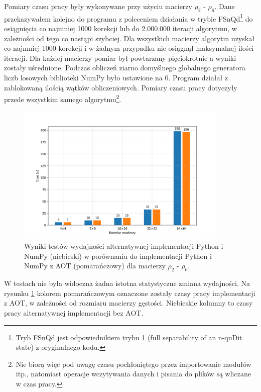 \documentclass[10pt, a4paper]{article}
\begin{document}
\begin{sloppypar}
    Pomiary czasu pracy były wykonywane przy użyciu macierzy $\rho_{2}$ - $\rho_{6}$.
    Dane przekazywałem kolejno do programu z poleceniem działania w trybie FSnQd\footnote{Tryb
    FSnQd jest odpowiednikiem trybu 1 (full separability of an n-quDit state) z oryginalnego
    kodu.} do osiągnięcia co najmniej 1000 korekcji lub do 2.000.000 iteracji algorytmu,
    w zależności od tego co nastąpi szybciej. Dla wszystkich macierzy algorytm uzyskał
    co najmniej 1000 korekcji i w żadnym przypadku nie osiągnął maksymalnej ilości
    iteracji. Dla każdej macierzy pomiar był powtarzany pięciokrotnie a wyniki zostały uśrednione.
    Podczas obliczeń ziarno domyślnego globalnego generatora liczb losowych biblioteki
    NumPy było ustawione na 0. Program działał z zablokowaną ilością wątków
    obliczeniowych. Pomiary czasu pracy dotyczyły przede wszystkim samego algorytmu\footnote{Nie
    biorą więc pod uwagę czasu pochłoniętego przez importowanie modułów itp., natomiast
    operacje wczytywania danych i pisania do plików są wliczane w czas pracy.}.

    \FloatBarrier
    \begin{figure}[ht]
      \centering
      \includegraphics[width=0.9\textwidth]{"resources/benchmark_3/plot.png"}
      \caption{Wyniki testów wydajności alternatywnej implementacji Python i NumPy (niebieski) w porównaniu do implementacji Python i NumPy z AOT (pomarańczowy) dla macierzy $\rho
      _{2}$ - $\rho_{6}$.}
      \label{second-perf}
    \end{figure}
    \FloatBarrier

    W testach nie była widoczna żadna istotna statystyczne zmiana wydajności. Na rysunku
    \ref{second-perf} kolorem pomarańczowym oznaczone zostały czasy pracy implementacji
    z AOT, w zależności od rozmiaru macierzy gęstości. Niebieskie kolumny to czasy pracy
    alternatywnej implementacji bez AOT.


\end{sloppypar}
\end{document}
